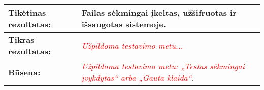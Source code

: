 \documentclass[12pt]{article}
\begin{document}
\begin{table}[htb!]
\begin{tabular}{|m{6cm}|m{11cm}|}
        \hline
        \raggedleft \textbf{\cellcolor{deepchampagne}Tikėtinas rezultatas:}
        & Failas sėkmingai įkeltas, užšifruotas ir išsaugotas sistemoje. \\
        \hline
        \raggedleft \textbf{\cellcolor{deepchampagne}Tikras rezultatas:}
        & \textcolor{red}{\emph{Užpildoma testavimo metu...}} \\
        \hline
        \raggedleft \textbf{\cellcolor{deepchampagne}Būsena:}
        & \textcolor{red}{\emph{Užpildoma testavimo metu: „Testas sėkmingai
        įvykdytas“ arba „Gauta klaida“}}. \\
        \hline
    \end{tabular}
    \label{table:TS_2}
\end{table}

\newpage
\end{document}

